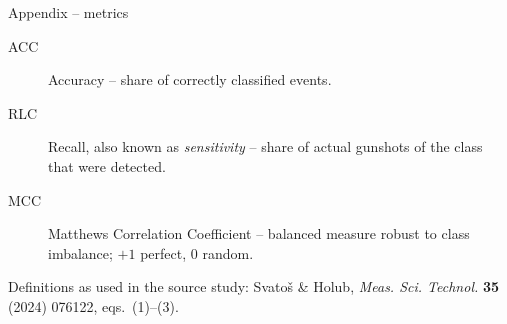 \documentclass[aspectratio=169,10pt]{beamer}
\begin{document}
\begin{frame}{Appendix -- metrics}
  \begin{description}
    \item[ACC] Accuracy -- share of correctly classified events.
    \item[RLC] Recall, also known as \emph{sensitivity} -- share of actual gunshots
      of the class that were detected.
    \item[MCC] Matthews Correlation Coefficient -- balanced measure robust to class
      imbalance; $+1$ perfect, $0$ random.
  \end{description}
  \vfill
  {\small\color{gray} Definitions as used in the source study: Svatoš \& Holub,
   \emph{Meas. Sci. Technol.} \textbf{35} (2024) 076122, eqs.~(1)--(3).}
\end{frame}
\end{document}
